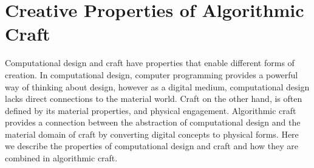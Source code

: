 \documentclass{sigchi}
\begin{document}
\section{Creative Properties of Algorithmic Craft}
Computational design and craft have properties that enable different forms of creation. In computational design, computer programming provides a powerful way of thinking about design, however as a digital medium, computational design lacks direct connections to the material world. Craft on the other hand, is often defined by its material properties, and physical engagement. Algorithmic craft provides a connection between the abstraction of computational design and the material domain of craft by converting digital concepts to physical forms. Here we describe the properties of computational design and craft and how they are combined in algorithmic craft.
\end{document}
